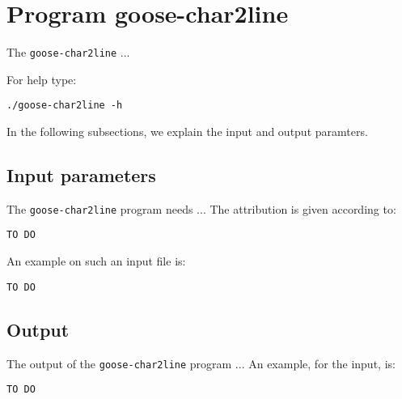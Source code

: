 \section{Program goose-char2line}
The \texttt{goose-char2line} ...

For help type:
\begin{lstlisting}
./goose-char2line -h
\end{lstlisting}
In the following subsections, we explain the input and output paramters.

\subsection{Input parameters}

The \texttt{goose-char2line} program needs ...
The attribution is given according to:
\begin{lstlisting}
TO DO
\end{lstlisting}

An example on such an input file is:
\begin{lstlisting}
TO DO
\end{lstlisting}

\subsection{Output}
The output of the \texttt{goose-char2line} program ...
An example, for the input, is:
\begin{lstlisting}
TO DO
\end{lstlisting}